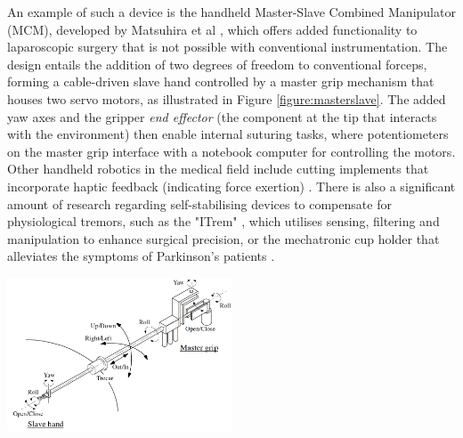 \documentclass[11pt]{article}
\begin{document}
An example of such a device is the handheld Master-Slave Combined Manipulator (MCM), developed by Matsuhira et al \cite{Matsuhira2002}, which offers added functionality to laparoscopic surgery that is not possible with conventional instrumentation. The design entails the addition of two degrees of freedom to conventional forceps, forming a cable-driven slave hand controlled by a master grip mechanism that houses two servo motors, as illustrated in Figure \ref{figure:masterslave}. The added yaw axes and the gripper \textit{end effector} (the component at the tip that interacts with the environment) then enable internal suturing tasks, where potentiometers on the master grip interface with a notebook computer for controlling the motors. Other handheld robotics in the medical field include cutting implements that incorporate haptic feedback (indicating force exertion) \cite{Payne2015}. There is also a significant amount of research regarding self-stabilising devices to compensate for physiological tremors, such as the  "ITrem" \cite{Latt2009}, which utilises sensing, filtering and manipulation to enhance surgical precision, or the mechatronic cup holder that alleviates the symptoms of Parkinson's patients \cite{Fischer2010}.

\begin{center}
\includegraphics[width=0.5\textwidth]{laparascopic.png}
\label{figure:masterslave}
\end{center}
\end{document}
